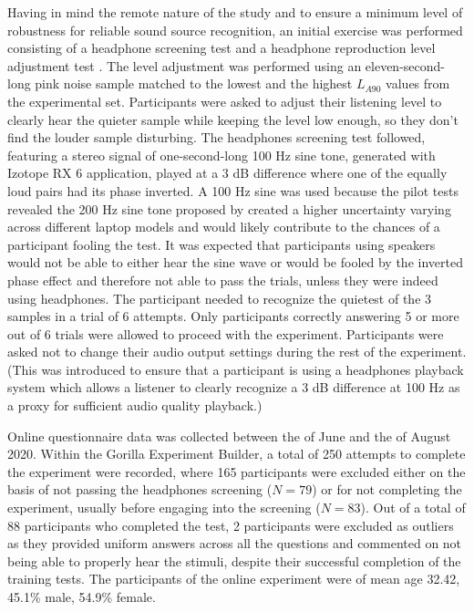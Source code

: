 Having in mind the remote nature of the study and to ensure a minimum level of robustness for reliable sound source recognition, an initial exercise was performed consisting of a headphone screening test \citep{woods_headphone_2017} and a headphone reproduction level adjustment test \citep{gontier_estimation_2019}. The level adjustment was performed using an eleven-second-long pink noise sample matched to the lowest and the highest $L_{A90}$ values from the experimental set. Participants were asked to adjust their listening level to clearly hear the quieter sample while keeping the level low enough, so they don’t find the louder sample disturbing. The headphones screening test followed, featuring a stereo signal of one-second-long 100 Hz sine tone, generated with Izotope RX 6 application, played at a 3 dB difference where one of the equally loud pairs had its phase inverted. A 100 Hz sine was used because the pilot tests revealed the 200 Hz sine tone proposed by \citet{woods_headphone_2017} created a higher uncertainty varying across different laptop models and would likely contribute to the chances of a participant fooling the test. It was expected that participants using speakers would not be able to either hear the sine wave or would be fooled by the inverted phase effect and therefore not able to pass the trials, unless they were indeed using headphones. The participant needed to recognize the quietest of the 3 samples in a trial of 6 attempts. Only participants correctly answering 5 or more out of 6 trials were allowed to proceed with the experiment. Participants were asked not to change their audio output settings during the rest of the experiment. (This was introduced to ensure that a participant is using a headphones playback system which allows a listener to clearly recognize a 3 dB difference at 100 Hz as a proxy for sufficient audio quality playback.)

Online questionnaire data was collected between the  of June and the  of August 2020. Within the Gorilla Experiment Builder, a total of 250 attempts to complete the experiment were recorded, where 165 participants were excluded either on the basis of not passing the headphones screening ($N=79$) or for not completing the experiment, usually before engaging into the screening ($N=83$). Out of a total of 88 participants who completed the test, 2 participants were excluded as outliers as they provided uniform answers across all the questions and commented on not being able to properly hear the stimuli, despite their successful completion of the training tests. The participants of the online experiment were of mean age 32.42, 45.1\% male, 54.9\% female.

